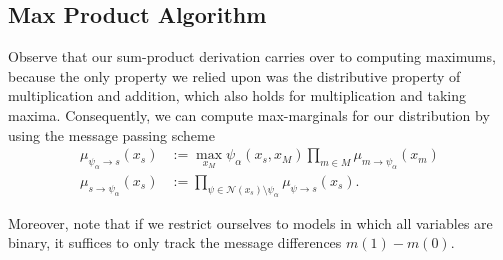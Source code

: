 \subsection{Max Product Algorithm}

Observe that our sum-product derivation carries over to computing maximums, because the only property we relied upon was the distributive property of multiplication and addition, which also holds for multiplication and taking maxima.  Consequently, we can compute max-marginals for our distribution by using the message passing scheme
\begin{equation*}
\begin{aligned}
\mu_{\psi_\alpha\rightarrow s}(x_s) &:= \max_{x_M} \psi_\alpha(x_s, x_M) \prod_{m \in M} \mu_{m\rightarrow \psi_\alpha}(x_m)\\
\mu_{s\rightarrow \psi_\alpha}(x_s) &:= \prod_{\psi \in \mathcal{N}(x_s) \setminus \psi_\alpha} \mu_{\psi \rightarrow s}(x_s).
\end{aligned}
\end{equation*}

Moreover, note that if we restrict ourselves to models in which all variables are binary, it suffices to only track the message differences $m(1) - m(0)$.

%
%
